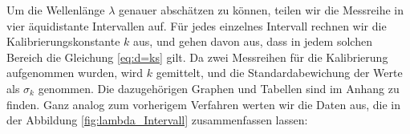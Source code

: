\documentclass[12pt,a4paper]{article}
\begin{document}
Um die Wellenlänge $\lambda$ genauer abschätzen zu können, teilen wir die Messreihe in vier äquidistante Intervallen auf. Für jedes einzelnes Intervall rechnen wir die Kalibrierungskonstante $k$ aus, und gehen davon aus, dass in jedem solchen Bereich die Gleichung \ref{eq:d=ks} gilt. Da zwei Messreihen für die Kalibrierung aufgenommen wurden, wird $k$ gemittelt, und die Standardabewichung der Werte als $\sigma_{k}$ genommen. Die dazugehörigen Graphen und Tabellen sind im Anhang zu finden. Ganz analog zum vorherigem Verfahren werten wir die Daten aus, die in der Abbildung \ref{fig:lambda_Intervall} zusammenfassen lassen:
\begin{figure}[H]
	\centering
	\qquad
	\label{}
\end{figure}
\end{document}
